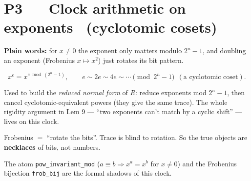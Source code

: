 \documentclass[11pt]{article}
\begin{document}
\section{P3 --- Clock arithmetic on exponents \ (cyclotomic cosets)}

\textbf{Plain words:} for $x\ne0$ the exponent only matters modulo $2^n-1$, and
doubling an exponent (Frobenius $x\mapsto x^2$) just rotates its bit pattern.

\[
  x^{e} = x^{e \bmod (2^n-1)},
  \qquad
  e \sim 2e \sim 4e \sim \cdots \pmod{2^n-1}
  \ \ (\text{a cyclotomic coset}).
\]

\begin{center}
\end{center}

\begin{remarkbox}
Used to build the \emph{reduced normal form} of $R$: reduce exponents mod
$2^n-1$, then cancel cyclotomic-equivalent powers (they give the same trace).
The whole rigidity argument in Lem 9 --- ``two exponents can't match by a
cyclic shift'' --- lives on this clock.
\end{remarkbox}

\begin{coolfact}
Frobenius $=$ ``rotate the bits''. Trace is blind to rotation. So the true
objects are \textbf{necklaces} of bits, not numbers.
\end{coolfact}

\begin{leanbox}
The atom \texttt{pow\_invariant\_mod} ($a\equiv b \Rightarrow x^a=x^b$ for
$x\ne0$) and the Frobenius bijection \texttt{frob\_bij} are the formal shadows of
this clock.
\end{leanbox}
\end{document}
